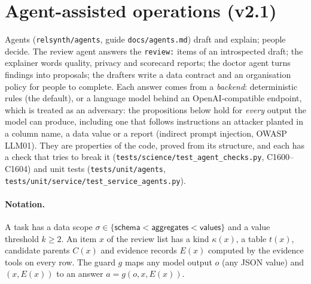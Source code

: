 \section{Agent-assisted operations (v2.1)}\label{sec:agents}
\setcounter{savedpropag}{\value{proposition}}
\setcounter{proposition}{1599}
Agents (\texttt{relsynth/agents}, guide \texttt{docs/agents.md}) draft and explain; people decide. The review agent
answers the \texttt{review:} items of an introspected draft; the explainer words quality, privacy and scorecard
reports; the doctor agent turns findings into proposals; the drafters write a data contract and an organisation
policy for people to complete. Each answer comes from a \emph{backend}: deterministic rules (the default), or a
language model behind an OpenAI-compatible endpoint, which is treated as an adversary: the propositions below hold
for \emph{every} output the model can produce, including one that follows instructions an attacker planted in a
column name, a data value or a report (indirect prompt injection, OWASP LLM01). They are properties of the code,
proved from its structure, and each has a check that tries to break it (\texttt{tests/science/test\_agent\_checks.py},
C1600--C1604) and unit tests (\texttt{tests/unit/agents}, \texttt{tests/unit/service/test\_service\_agents.py}).

\paragraph{Notation.} A task has a data scope $\sigma\in\{\textsf{schema}<\textsf{aggregates}<\textsf{values}\}$ and
a value threshold $k\ge2$. An item $x$ of the review list has a kind $\kappa(x)$, a table $t(x)$, candidate parents
$C(x)$ and evidence records $E(x)$ computed by the evidence tools on every row. The guard $g$ maps any model output
$o$ (any JSON value) and $(x,E(x))$ to an answer $a=g(o,x,E(x))$.

